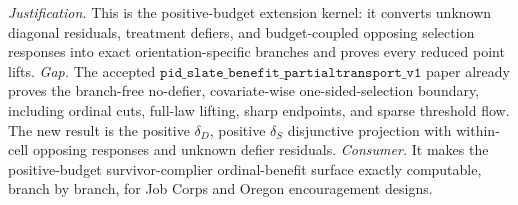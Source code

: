 \documentclass{article}
\begin{document}
\par\smallskip\noindent \textit{Justification.} This is the positive-budget extension kernel: it converts unknown diagonal residuals, treatment defiers, and budget-coupled opposing selection responses into exact orientation-specific branches and proves every reduced point lifts. \textit{Gap.} The accepted \(\texttt{pid\_slate\_benefit\_partialtransport\_v1}\) paper already proves the branch-free no-defier, covariate-wise one-sided-selection boundary, including ordinal cuts, full-law lifting, sharp endpoints, and sparse threshold flow. The new result is the positive \(\delta_D\), positive \(\delta_S\) disjunctive projection with within-cell opposing responses and unknown defier residuals. \textit{Consumer.} It makes the positive-budget survivor-complier ordinal-benefit surface exactly computable, branch by branch, for Job Corps and Oregon encouragement designs.
\end{document}
